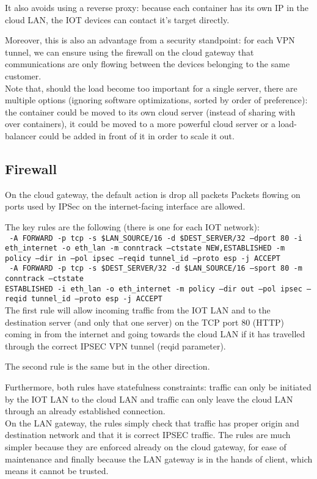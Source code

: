 \documentclass[paper=a4, fontsize=11pt]{scrartcl}
\begin{document}
It also avoids using a reverse proxy: because each container has its own IP in
the cloud LAN, the IOT devices can contact it's target directly.

Moreover, this is also an advantage from a security standpoint: for each VPN
tunnel, we can ensure using the firewall on the cloud gateway that
communications are only flowing between the devices belonging to the same
customer.
\\

Note that, should the load become too important for a single server, there are
multiple options (ignoring software optimizations, sorted by order of
preference): the container could be moved to its own cloud server (instead of
sharing with over containers), it could be moved to a more powerful cloud server
or a load-balancer could be added in front of it in order to scale it out.

\subsection{Firewall}\label{firewall}

On the cloud gateway, the default action is drop all packets
Packets flowing on ports used by IPSec on the internet-facing interface are
allowed.

The key rules are the following (there is one for each IOT network):
\\

\texttt{%
    -A FORWARD -p tcp -s \$LAN\_SOURCE/16 -d \$DEST\_SERVER/32 --dport 80 -i
    eth\_internet -o eth\_lan -m conntrack --ctstate NEW,ESTABLISHED -m policy
    --dir in --pol ipsec --reqid tunnel\_id --proto esp -j ACCEPT
}
\\

\texttt{%
    -A FORWARD -p tcp -s \$DEST\_SERVER/32 -d \$LAN\_SOURCE/16 --sport 80 -m
    conntrack --ctstate \\ESTABLISHED -i eth\_lan -o eth\_internet -m policy --dir
    out --pol ipsec --reqid tunnel\_id --proto esp -j ACCEPT
}
\\

The first rule will allow incoming traffic from the IOT LAN and to the
destination server (and only that one server) on the TCP port 80 (HTTP) coming
in from the internet and going towards the cloud LAN if it has travelled
through the correct IPSEC VPN tunnel (reqid parameter).

The second rule is the same but in the other direction.

Furthermore, both rules have statefulness constraints: traffic can only be
initiated by the IOT LAN to the cloud LAN and traffic can only leave the cloud
LAN through an already established connection.
\\

On the LAN gateway, the rules simply check that traffic has proper origin and
destination network and that it is correct IPSEC traffic.
The rules are much simpler because they are enforced already on the cloud
gateway, for ease of maintenance and finally because the LAN gateway is in the
hands of client, which means it cannot be trusted.
\end{document}
